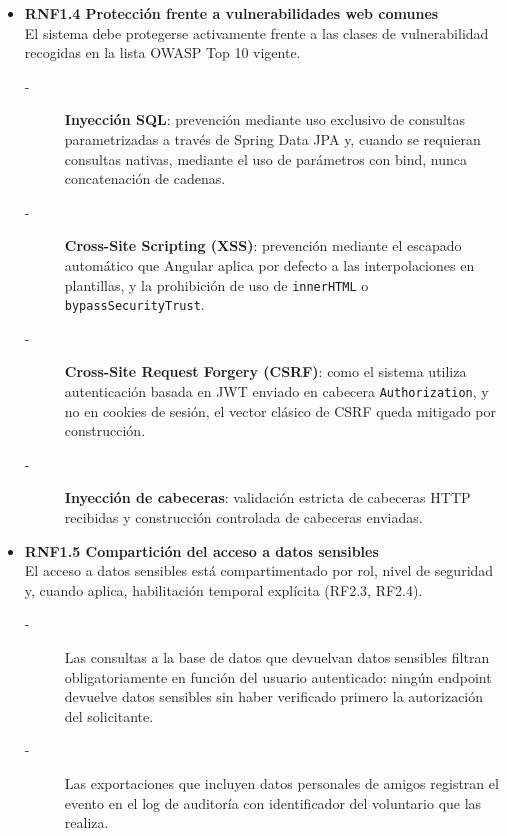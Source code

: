 \begin{itemize}
    \item \textbf{RNF1.4 Protección frente a vulnerabilidades web comunes} \\
    El sistema debe protegerse activamente frente a las clases de
    vulnerabilidad recogidas en la lista OWASP Top 10 vigente.
    \begin{description}
        \item[-] \textbf{Inyección SQL}: prevención mediante uso exclusivo de consultas
        parametrizadas a través de Spring Data JPA y, cuando se requieran
        consultas nativas, mediante el uso de parámetros con bind, nunca
        concatenación de cadenas. 
        \item[-] \textbf{Cross-Site Scripting (XSS)}: prevención mediante el escapado
        automático que Angular aplica por defecto a las interpolaciones
        en plantillas, y la prohibición de uso de \texttt{innerHTML} o
        \texttt{bypassSecurityTrust}.
        \item[-] \textbf{Cross-Site Request Forgery (CSRF)}: como el sistema utiliza
        autenticación basada en JWT enviado en cabecera \texttt{Authorization},
        y no en cookies de sesión, el vector clásico de CSRF queda
        mitigado por construcción.
        \item[-] \textbf{Inyección de cabeceras}: validación estricta de cabeceras
        HTTP recibidas y construcción controlada de cabeceras enviadas.
    \end{description}


    \item \textbf{RNF1.5 Compartición del acceso a datos sensibles} \\
    El acceso a datos sensibles está compartimentado por rol, nivel de
    seguridad y, cuando aplica, habilitación temporal explícita
    (RF2.3, RF2.4).
    \begin{description}
        \item[-] Las consultas a la base de datos que devuelvan datos sensibles
        filtran obligatoriamente en función del usuario autenticado: ningún
        endpoint devuelve datos sensibles sin haber verificado primero la
        autorización del solicitante.
        \item[-] Las exportaciones que incluyen datos personales de amigos
        registran el evento en el log de auditoría con identificador del
        voluntario que las realiza.
    \end{description}



\end{itemize}
